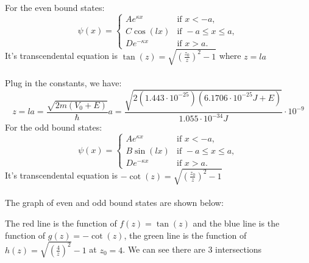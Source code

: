 \documentclass{article}
\begin{document}
\noindent For the even bound states:
\begin{equation}
    \label{eq:even}
    \psi(x) = \begin{cases}
        Ae^{\kappa x} & \text{if } x < -a,\\
        C \cos(l x) & \text{if } -a \leq x \leq a,\\
        De^{-\kappa x} & \text{if } x > a.
    \end{cases}
\end{equation}
It's transcendental equation is \(\tan(z) = \sqrt{\left(\frac{z_0}{z}\right)^2 -1}\)
where \(z = l a\) \\ \\
Plug in the constants, we have:
\begin{equation}
    z = la = \frac{\sqrt{2m(V_0 + E)}}{\hbar} a = \frac{\sqrt{2(1.443 \cdot 10^{-25})(6.1706 \cdot 10^{-25} J + E)}}{1.055\cdot 10^{-34} J} \cdot 10^{-9}
\end{equation}
\noindent For the odd bound states:
\begin{equation}    
    \psi(x) = \begin{cases}
        Ae^{\kappa x} & \text{if } x < -a,\\
        B \sin(l x) & \text{if } -a \leq x \leq a,\\
        De^{-\kappa x} & \text{if } x > a.
    \end{cases}
\end{equation}
It's transcendental equation is \(-\cot(z) = \sqrt{\left(\frac{z_0}{z}\right)^2 - 1}\)  \\ \\
The graph of even and odd bound states are shown below:
\begin{figure}[H]
    \centering
\end{figure}
The red line is the function of \(f(z) = \tan(z)\) and the blue line is the function of \(g(z) = -\cot(z)\), the green line is the function of \(h(z) = \sqrt{\left(\frac{4}{z}\right)^2}-1\) at \(z_0 = 4\). We can see there are 3 intersections
\end{document}
